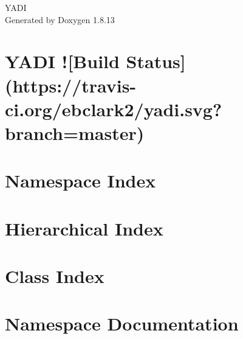 \documentclass[twoside]{book}
\newcommand{\+}{\discretionary{\mbox{\scriptsize$\hookleftarrow$}}{}{}}
\newcommand{\clearemptydoublepage}{%
  \newpage{\pagestyle{empty}\cleardoublepage}%
}
\begin{document}
\hypersetup{pageanchor=false,
             bookmarksnumbered=true,
             pdfencoding=unicode
            }
\begin{titlepage}
\vspace*{7cm}
\begin{center}%
{\Large Y\+A\+DI }\\
\vspace*{1cm}
{\large Generated by Doxygen 1.8.13}\\
\end{center}
\end{titlepage}
\clearemptydoublepage
{}
\tableofcontents
\clearemptydoublepage
{}
\hypersetup{pageanchor=true}

\chapter{Y\+A\+DI !\mbox{[}Build Status\mbox{]}(https\+://travis-\/ci.org/ebclark2/yadi.svg?branch=master)}
\label{index}\hypertarget{index}{}
\chapter{Namespace Index}

\chapter{Hierarchical Index}

\chapter{Class Index}

\chapter{Namespace Documentation}

\end{document}
